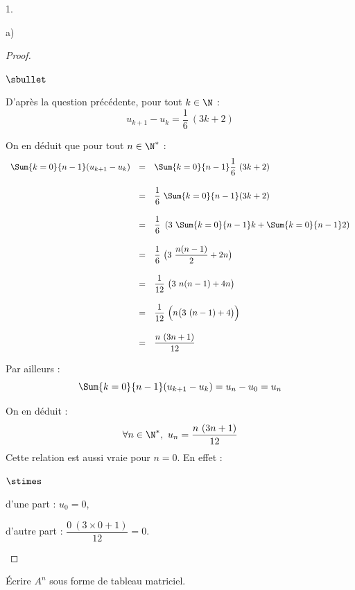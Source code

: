 \documentclass[11pt]{article}%
\begin{document}
\begin{noliste}{1.}
\begin{noliste}{a)}
    \begin{proof}~%
      \begin{noliste}{$\sbullet$}
      \item D'après la question précédente, pour tout $k \in \N$ :
        \[
        u_{k+1} - u_k = \dfrac{1}{6} \ (3k + 2)
        \]
      \item On en déduit que pour tout $n \in \N^*$ : 
        \[
        \begin{array}{rcl}
          \Sum{k=0}{n-1} (u_{k+1} - u_k) & = & \Sum{k=0}{n-1}
          \dfrac{1}{6} \ (3k + 2) 
          \\[.6cm]
          & = & \dfrac{1}{6} \ \Sum{k=0}{n-1} (3k + 2) 
          \\[.6cm]
          & = & \dfrac{1}{6} \ \left(3 \ \Sum{k=0}{n-1} k +
            \Sum{k=0}{n-1} 2 \right) 
          \\[.6cm]
          & = & \dfrac{1}{6} \ \big(3 \ \dfrac{n(n-1)}{2} + 2 n \big) 
          \\[.6cm]
          & = & \dfrac{1}{12} \ \big(3 \ n(n-1) + 4 n \big) 
          \\[.6cm]
          & = & \dfrac{1}{12} \ \Big( n \big(3 \ (n-1) + 4 \big) \Big) 
          \\[.6cm]
          & = & \dfrac{n \ (3n+1)}{12}
        \end{array}
        \]
      \item Par ailleurs :
        \[
        \Sum{k=0}{n-1} (u_{k+1} - u_k) = u_n - u_0 = u_n
        \]        
      \item On en déduit : 
        \[
        \forall n \in \N^*, \ u_n = \dfrac{n \ (3n+1)}{12}
        \]
        Cette relation est aussi vraie pour $n = 0$. En effet :
        \begin{noliste}{$\stimes$}
        \item d'une part : $u_0 = 0$,
        \item d'autre part : $\dfrac{0 \ (3 \times 0+1)}{12} = 0$.
        \end{noliste}

      \end{noliste}
    \end{proof}


    \newpage


  \item Écrire $A^{n}$ sous forme de tableau matriciel.


\end{noliste}
\end{noliste}
\end{document}
